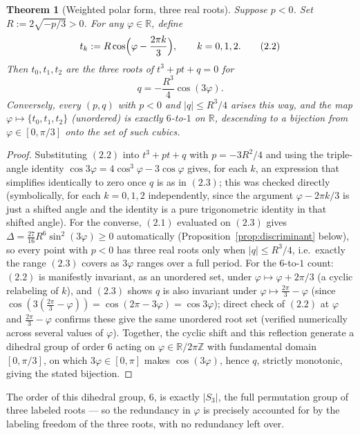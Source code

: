 \documentclass[11pt]{amsart}
\newtheorem{theorem}{Theorem}[section]
\theoremstyle{remark}
\begin{document}
\begin{theorem}[Weighted polar form, three real roots]\label{thm:polar}
Suppose $p<0$. Set $R:=2\sqrt{-p/3}>0$. For any $\varphi\in\mathbb R$, define
\begin{equation}
t_k:=R\cos\Bigl(\varphi-\frac{2\pi k}3\Bigr),\qquad k=0,1,2. \tag{2.2}
\end{equation}
Then $t_0,t_1,t_2$ are the three roots of $t^3+pt+q=0$ for
\begin{equation}
q=-\frac{R^3}4\cos(3\varphi). \tag{2.3}
\end{equation}
Conversely, every $(p,q)$ with $p<0$ and $|q|\le R^3/4$ arises this way, and the map $\varphi\mapsto\{t_0,t_1,t_2\}$ (unordered) is exactly $6$-to-$1$ on $\mathbb R$, descending to a bijection from $\varphi\in[0,\pi/3]$ onto the set of such cubics.
\end{theorem}

\begin{proof}
Substituting $(2.2)$ into $t^3+pt+q$ with $p=-3R^2/4$ and using the triple-angle identity $\cos3\varphi=4\cos^3\varphi-3\cos\varphi$ gives, for each $k$, an expression that simplifies identically to zero once $q$ is as in $(2.3)$; this was checked directly (symbolically, for each $k=0,1,2$ independently, since the argument $\varphi-2\pi k/3$ is just a shifted angle and the identity is a pure trigonometric identity in that shifted angle). For the converse, $(2.1)$ evaluated on $(2.3)$ gives $\Delta=\tfrac{27}{16}R^6\sin^2(3\varphi)\ge0$ automatically (Proposition~\ref{prop:discriminant} below), so every point with $p<0$ has three real roots only when $|q|\le R^3/4$, i.e.\ exactly the range $(2.3)$ covers as $3\varphi$ ranges over a full period. For the $6$-to-$1$ count: $(2.2)$ is manifestly invariant, as an unordered set, under $\varphi\mapsto\varphi+2\pi/3$ (a cyclic relabeling of $k$), and $(2.3)$ shows $q$ is also invariant under $\varphi\mapsto\tfrac{2\pi}3-\varphi$ (since $\cos(3(\tfrac{2\pi}3-\varphi))=\cos(2\pi-3\varphi)=\cos3\varphi$); direct check of $(2.2)$ at $\varphi$ and $\tfrac{2\pi}3-\varphi$ confirms these give the same unordered root set (verified numerically across several values of $\varphi$). Together, the cyclic shift and this reflection generate a dihedral group of order $6$ acting on $\varphi\in\mathbb R/2\pi\mathbb Z$ with fundamental domain $[0,\pi/3]$, on which $3\varphi\in[0,\pi]$ makes $\cos(3\varphi)$, hence $q$, strictly monotonic, giving the stated bijection.
\end{proof}

The order of this dihedral group, $6$, is exactly $|S_3|$, the full permutation group of three labeled roots --- so the redundancy in $\varphi$ is precisely accounted for by the labeling freedom of the three roots, with no redundancy left over.
\end{document}
